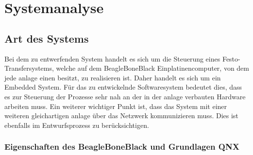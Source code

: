 

























\section{Systemanalyse}\label{sec:systemanalyse}


\subsection{Art des Systems}

Bei dem zu entwerfenden System handelt es sich um die Steuerung eines Festo-Transfersystems,
welche auf dem BeagleBoneBlack Einplatinencomputer, von dem jede \gls{anlage} einen besitzt, zu realisieren ist.
Daher handelt es sich um ein Embedded System.
Für das zu entwickelnde Softwaresystem bedeutet dies, dass es zur Steuerung der Prozesse sehr nah
an der in der \gls{anlage} verbauten Hardware arbeiten muss.
Ein weiterer wichtiger Punkt ist, dass das System mit einer weiteren gleichartigen \gls{anlage} über
das Netzwerk kommunizieren muss. Dies ist ebenfalls im Entwurfsprozess zu berücksichtigen.

\subsubsection{Eigenschaften des BeagleBoneBlack und Grundlagen QNX}

